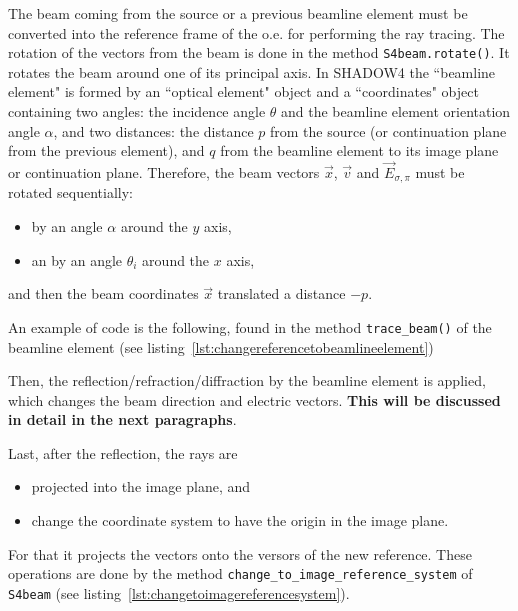 \documentclass{iucr}
\begin{document}
The beam coming from the source or a previous beamline element must be converted into the reference frame of the o.e. for performing the ray tracing.
The rotation of the vectors from the beam is done in the method {\tt S4beam.rotate()}.
It rotates the beam around one of its principal axis.
In SHADOW4 the ``beamline element" is formed by an ``optical element" object and a ``coordinates" object containing two angles: the incidence angle $\theta$ and the beamline element orientation angle $\alpha$, and two distances: the distance $p$ from the source (or continuation plane from the previous element), and $q$ from the beamline element to its image plane or continuation plane.
Therefore, the beam vectors $\vec{x}$,  $\vec{v}$ and $\vec{E}_{\sigma,\pi}$ must be rotated sequentially:
\begin{itemize}
    \item by an angle $\alpha$ around the $y$ axis, 
    \item an by an angle $\theta_i$ around the $x$ axis,
\end{itemize}
and then the beam coordinates $\vec{x}$ translated a distance $-p$. 

An example of code is the following, found in the method {\tt trace\_beam()} of the beamline element (see listing~\ref{lst:changereferencetobeamlineelement})


Then, the reflection/refraction/diffraction by the beamline element is applied, which changes the beam direction and electric vectors.
{\bf This will be discussed in detail in the next paragraphs}.

Last, after the reflection, the rays are 
\begin{itemize}
    \item projected into the image plane, and
    \item change the coordinate system to have the origin in the image plane.
\end{itemize}
For that it projects the  vectors onto the versors of the new reference. 
These operations are done by the method {\tt change\_to\_image\_reference\_system} of {\tt S4beam} (see listing~\ref{lst:changetoimagereferencesystem}).
\end{document}
